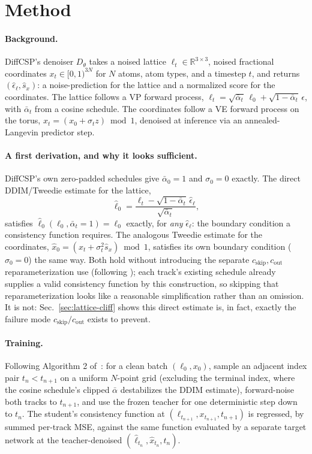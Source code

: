 \documentclass{article}
\begin{document}
\section{Method}

\paragraph{Background.} DiffCSP's denoiser $D_\theta$ takes a noised lattice $\ell_t \in \mathbb{R}^{3 \times 3}$, noised fractional coordinates $x_t \in [0,1)^{3N}$ for $N$ atoms, atom types, and a timestep $t$, and returns $(\hat\epsilon_\ell, \hat s_x)$: a noise-prediction for the lattice and a normalized score for the coordinates. The lattice follows a VP forward process, $\ell_t = \sqrt{\bar\alpha_t}\,\ell_0 + \sqrt{1-\bar\alpha_t}\,\epsilon$, with $\bar\alpha_t$ from a cosine schedule. The coordinates follow a VE forward process on the torus, $x_t = (x_0 + \sigma_t z) \bmod 1$, denoised at inference via an annealed-Langevin predictor step.

\paragraph{A first derivation, and why it looks sufficient.} DiffCSP's own zero-padded schedules give $\bar\alpha_0 = 1$ and $\sigma_0 = 0$ exactly. The direct DDIM/Tweedie estimate for the lattice,
\[
  \hat\ell_0 = \frac{\ell_t - \sqrt{1-\bar\alpha_t}\,\hat\epsilon_\ell}{\sqrt{\bar\alpha_t}},
\]
satisfies $\hat\ell_0(\ell_0, \bar\alpha_t{=}1) = \ell_0$ exactly, for \emph{any} $\hat\epsilon_\ell$: the boundary condition a consistency function requires. The analogous Tweedie estimate for the coordinates, $\hat x_0 = (x_t + \sigma_t^2 \hat s_x) \bmod 1$, satisfies its own boundary condition ($\sigma_0=0$) the same way. Both hold without introducing the separate $c_{\text{skip}}, c_{\text{out}}$ reparameterization \citet{Song:2023cm} use (following \citet{Karras:2022edm}); each track's existing schedule already supplies a valid consistency function by this construction, so skipping that reparameterization looks like a reasonable simplification rather than an omission. It is not: Sec.~\ref{sec:lattice-cliff} shows this direct estimate is, in fact, exactly the failure mode $c_{\text{skip}}/c_{\text{out}}$ exists to prevent.

\paragraph{Training.} Following Algorithm 2 of~\citet{Song:2023cm}: for a clean batch $(\ell_0, x_0)$, sample an adjacent index pair $t_n < t_{n+1}$ on a uniform $N$-point grid (excluding the terminal index, where the cosine schedule's clipped $\bar\alpha$ destabilizes the DDIM estimate), forward-noise both tracks to $t_{n+1}$, and use the frozen teacher for one deterministic step down to $t_n$. The student's consistency function at $(\ell_{t_{n+1}}, x_{t_{n+1}}, t_{n+1})$ is regressed, by summed per-track MSE, against the same function evaluated by a separate target network at the teacher-denoised $(\hat\ell_{t_n}, \hat x_{t_n}, t_n)$.
\end{document}
